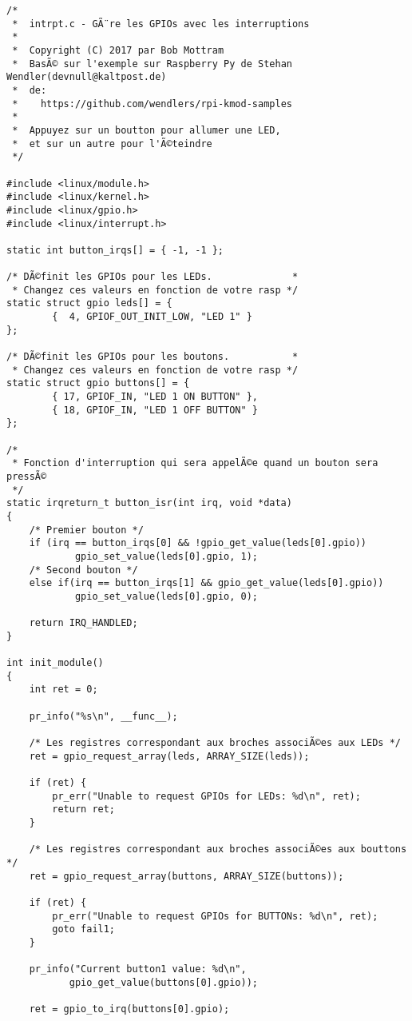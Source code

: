 \documentclass[11pt]{article}
\begin{document}
\begin{verbatim}
/*
 *  intrpt.c - GÃ¨re les GPIOs avec les interruptions
 *
 *  Copyright (C) 2017 par Bob Mottram
 *  BasÃ© sur l'exemple sur Raspberry Py de Stehan Wendler(devnull@kaltpost.de)
 *  de:
 *    https://github.com/wendlers/rpi-kmod-samples
 *
 *  Appuyez sur un boutton pour allumer une LED,
 *  et sur un autre pour l'Ã©teindre
 */

#include <linux/module.h>
#include <linux/kernel.h>
#include <linux/gpio.h>
#include <linux/interrupt.h>

static int button_irqs[] = { -1, -1 };

/* DÃ©finit les GPIOs pour les LEDs.              *
 * Changez ces valeurs en fonction de votre rasp */
static struct gpio leds[] = {
        {  4, GPIOF_OUT_INIT_LOW, "LED 1" }
};

/* DÃ©finit les GPIOs pour les boutons.           *
 * Changez ces valeurs en fonction de votre rasp */
static struct gpio buttons[] = {
        { 17, GPIOF_IN, "LED 1 ON BUTTON" },
        { 18, GPIOF_IN, "LED 1 OFF BUTTON" }
};

/*
 * Fonction d'interruption qui sera appelÃ©e quand un bouton sera pressÃ©
 */
static irqreturn_t button_isr(int irq, void *data)
{
    /* Premier bouton */
    if (irq == button_irqs[0] && !gpio_get_value(leds[0].gpio))
            gpio_set_value(leds[0].gpio, 1);
    /* Second bouton */
    else if(irq == button_irqs[1] && gpio_get_value(leds[0].gpio))
            gpio_set_value(leds[0].gpio, 0);

    return IRQ_HANDLED;
}

int init_module()
{
    int ret = 0;

    pr_info("%s\n", __func__);

    /* Les registres correspondant aux broches associÃ©es aux LEDs */
    ret = gpio_request_array(leds, ARRAY_SIZE(leds));

    if (ret) {
        pr_err("Unable to request GPIOs for LEDs: %d\n", ret);
        return ret;
    }

    /* Les registres correspondant aux broches associÃ©es aux bouttons */
    ret = gpio_request_array(buttons, ARRAY_SIZE(buttons));

    if (ret) {
        pr_err("Unable to request GPIOs for BUTTONs: %d\n", ret);
        goto fail1;
    }

    pr_info("Current button1 value: %d\n",
           gpio_get_value(buttons[0].gpio));

    ret = gpio_to_irq(buttons[0].gpio);


\end{verbatim}
\end{document}
